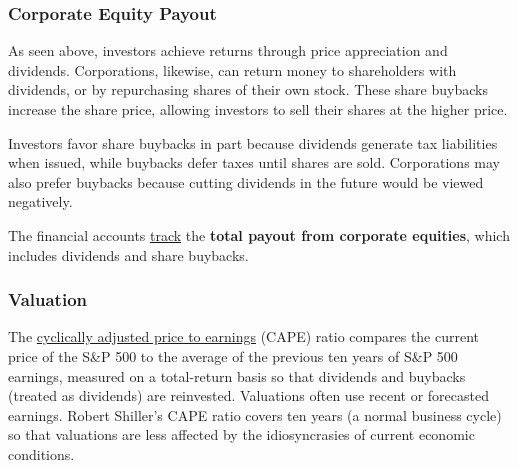 \subsubsection*{Corporate Equity Payout}
\begin{minipage}{0.76\textwidth}  
\small As seen above, investors achieve returns through price appreciation and dividends. Corporations, likewise, can return money to shareholders with dividends, or by repurchasing shares of their own stock. These share buybacks increase the share price, allowing investors to sell their shares at the higher price. 

Investors favor share buybacks in part because dividends generate tax liabilities when issued, while buybacks defer taxes until shares are sold. Corporations may also prefer buybacks because cutting dividends in the future would be viewed negatively. 

The financial accounts \href{https://www.federalreserve.gov/releases/z1/}{track} the \textbf{total payout from corporate equities}, which includes dividends and share buybacks. 
\vspace{1mm}

\vspace{3.5cm}

\hspace{5mm} 

\end{minipage}
\newpage
\subsubsection*{Valuation}
\begin{minipage}{0.76\textwidth}
 
\small The \href{http://www.econ.yale.edu/~shiller/data.htm}{cyclically adjusted price to earnings} (CAPE) ratio compares the current price of the S\&P 500 to the average of the previous ten years of S\&P 500 earnings, measured on a total-return basis so that dividends and buybacks (treated as dividends) are reinvested. Valuations often use recent or forecasted earnings. Robert Shiller's CAPE ratio covers ten years (a normal business cycle) so that valuations are less affected by the idiosyncrasies of current economic conditions. 


\end{minipage}
\vspace{1mm}

